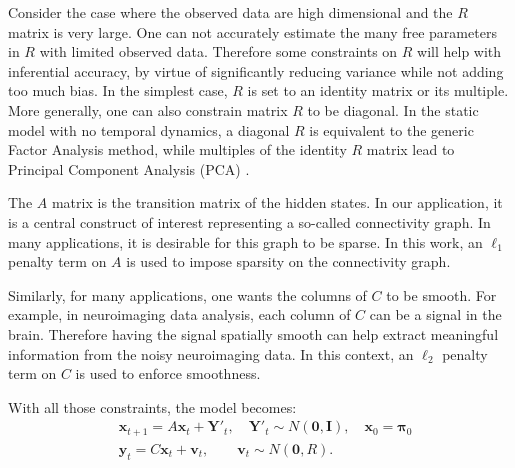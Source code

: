 \documentclass[fleqn]{article}
\providecommand{\mb}[1]{\boldsymbol{#1}}
\newcommand{\bx}{\mb{x}}
\newcommand{\by}{\mb{y}}
\newcommand{\bY}{\mb{Y}}
\begin{document}
Consider the case where the observed data are high dimensional and the $R$ matrix is very large. One can not accurately estimate the many free parameters in $R$ with limited observed data. Therefore some constraints on $R$ will help with inferential accuracy, by virtue of significantly reducing variance while not adding too much bias. In the simplest case, $R$ is set to an identity matrix or its multiple. More generally, one can also constrain matrix $R$ to be diagonal. In the static model with no temporal dynamics, a diagonal $R$ is equivalent to the generic Factor Analysis method, while multiples of the identity $R$ matrix lead to Principal Component Analysis (PCA) \cite{roweis1999unifying}.

The $A$ matrix is the transition matrix of the hidden states. In our application, it is a central construct of interest representing a so-called connectivity graph. In many applications, it is desirable for this graph to be sparse. In this work, an $\ell_1$ penalty term on $A$ is used to impose sparsity on the connectivity graph.

Similarly, for many applications, one wants the columns of $C$ to be smooth. For example, in neuroimaging data analysis, each column of $C$ can be a signal in the brain. Therefore having the signal spatially smooth can help extract meaningful information from the noisy neuroimaging data. In this context, an $\ell_2$ penalty term on $C$ is used to enforce smoothness.

With all those constraints, the model becomes:
\begin{equation}\label{eq:model0}
\begin{aligned}
	&\bx_{t+1}=A\bx_{t}+\bY'_t, \quad \bY'_t\sim N(\mathbf{0},\mathbf{I}),\quad \bx_0 = \mathbf{\pi}_0\\
	&\by_t=C\bx_t+\mathbf{v}_t,\qquad \mathbf{v}_t\sim N(\mathbf{0},R).
\end{aligned}
\end{equation}
\end{document}
